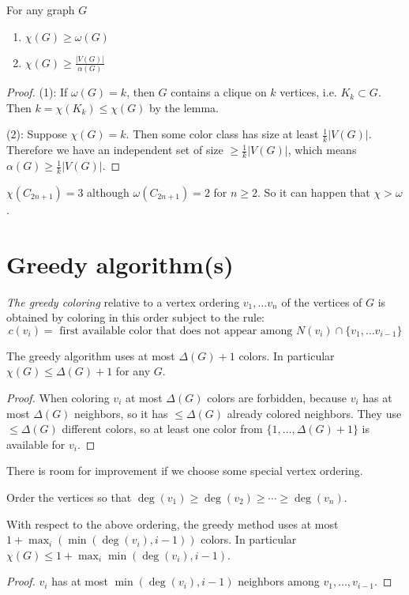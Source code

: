 \begin{lemma}
For any graph $G$
\begin{enumerate}[(1)]
\item $\chi(G) \ge \omega(G)$
\item $\chi(G) \ge \frac{|V(G)|}{\alpha(G)}$
\end{enumerate}
\end{lemma}
\begin{proof}
(1): If $\omega(G) = k$, then $G$ contains a clique on $k$ vertices,
i.e. $K_k \subset G$. Then $k = \chi(K_k) \le \chi(G)$ by the lemma.

(2): Suppose $\chi(G) = k$. Then some color class has size at least
$\frac{1}{k}|V(G)|$. Therefore we have an independent set of size $\ge
\frac{1}{k}|V(G)|$, which means $\alpha(G) \ge \frac{1}{k}|V(G)|$.
\end{proof}

\begin{example}
$\chi(C_{2n + 1}) = 3$ although $\omega(C_{2n + 1}) = 2$ for $n \ge 2$.
So it can happen that $\chi > \omega$.
\end{example}

\section{Greedy algorithm(s)}
\begin{definition}
\emph{The greedy coloring} relative to a vertex ordering $v_1, \ldots
v_n$ of the vertices of $G$ is obtained by coloring in this order
subject to the rule:
\[
c(v_i) = \text{ first available color that does not appear among }
N(v_i) \cap \{v_1,\ldots v_{i-1}\}
\]
\end{definition}

\begin{theorem}
The greedy algorithm uses at most $\Delta(G) + 1$ colors. In particular
$\chi(G) \le \Delta(G) + 1$ for any $G$.
\end{theorem}
\begin{proof}
When coloring $v_i$ at most $\Delta(G)$ colors are forbidden, because
$v_i$ has at most $\Delta(G)$ neighbors, so it has $\le \Delta(G)$
already colored neighbors. They use $\le \Delta(G)$ different colors, so
at least one color from $\{1,\ldots,\Delta(G) + 1\}$ is available for
$v_i$.
\end{proof}
\begin{observation}
There is room for improvement if we choose some special vertex ordering.
\end{observation}
\begin{example}
Order the vertices so that $\deg(v_1) \ge \deg(v_2) \ge \cdots \ge
\deg(v_n)$.
\end{example}
\begin{theorem}
With respect to the above ordering, the greedy method uses at most $1 +
\max_i(\min(\deg(v_i),i-1))$ colors. In particular $\chi(G) \le 1 +
\max_i\min(\deg(v_i),i-1)$.
\end{theorem}
\begin{proof}
$v_i$ has at most $\min(\deg(v_i),i-1)$ neighbors among $v_1,\ldots,v_{i-1}$.
\end{proof}


